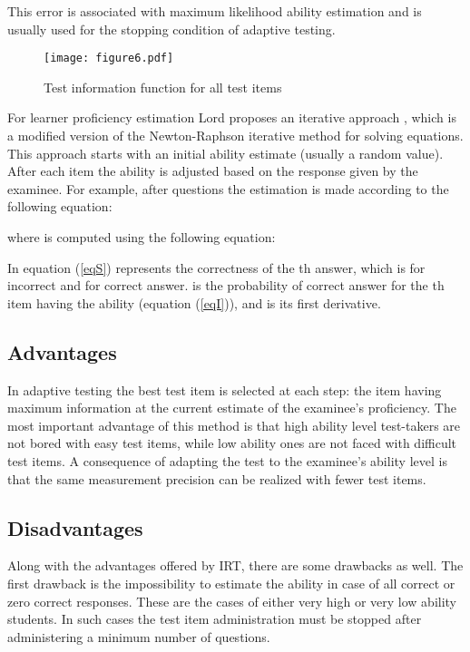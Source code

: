 \documentclass[11pt,twoside]{article}
\begin{document}
This error is associated with maximum likelihood ability estimation and is usually used for the stopping condition of adaptive testing. 


\begin{figure}
\begin{center}    \texttt{[image: figure6.pdf]} \end{center}
\caption{\label{fig:all} Test information function for all test items} 
\end{figure}

For learner proficiency estimation Lord proposes an iterative approach \cite{LORD}, which is a modified version of the Newton-Raphson iterative method for solving equations. This approach starts with an initial ability estimate (usually a random value). After each item the ability is adjusted based on the response given by the examinee. For example, after  questions the estimation is made according to the following equation:


where  is computed using the following equation:


In equation (\ref{eqS})  represents the correctness of the th  answer, which is  for incorrect and  for correct answer.  is the probability of correct answer for the th item having the ability  (equation (\ref{eqI})), and   is its  first derivative.


\subsection{Advantages}

In adaptive testing the best test item is selected at each step: the item having maximum information at the current estimate of the examinee's proficiency. The most important advantage of this method is that high ability level test-takers are not bored with easy test items, while low ability ones are not faced with difficult test items. A consequence of adapting the test to the examinee's ability level is  that the same measurement precision can be realized with fewer test items. 


\subsection{Disadvantages}


Along with the advantages offered by IRT, there are some drawbacks as well. The first drawback is the impossibility to estimate the ability in case of all correct or zero correct responses. These are the cases of either very high or very low ability students. In such cases the test item administration must be stopped after administering a minimum number of questions.
\end{document}
